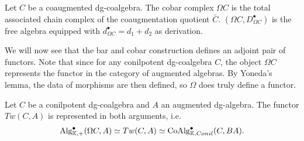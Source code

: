 \documentclass[../thesis.tex]{subfiles}
\begin{document}
            \begin{proposition}
                Let $C$ be a coaugmented dg-coalgebra. The cobar complex $\Omega C$ is the total associated chain complex of the coaugmentation quotient $\bar{C}$. $(\Omega C, D_{\Omega C}^\bullet)$ is the free algebra equipped with $d_{\Omega C}^\bullet = d_1 + d_2$ as derivation.
            \end{proposition}

            \begin{center}
            \end{center}

            We will now see that the bar and cobar construction defines an adjoint pair of functors. Note that since for any conilpotent dg-coalgebra $C$, the object $\Omega C$ represents the functor in the category of augmented algebras. By Yoneda's lemma, the data of morphisms are then defined, so $\Omega$ does truly define a functor.

            \begin{thm}\label{thm: cobar-bar-adj}
                Let $C$ be a conilpotent dg-coalgebra and $A$ an augmented dg-algebra. The functor $Tw(C,A)$ is represented in both arguments, i.e.
                \begin{align*}
                    \tt{Alg}_{\mathbb{K},+}^\bullet(\Omega C, A)\simeq Tw(C, A) \simeq \tt{CoAlg}_{\mathbb{K},Conil}^\bullet(C, BA)\text{.}
                \end{align*}
            \end{thm}
\end{document}
